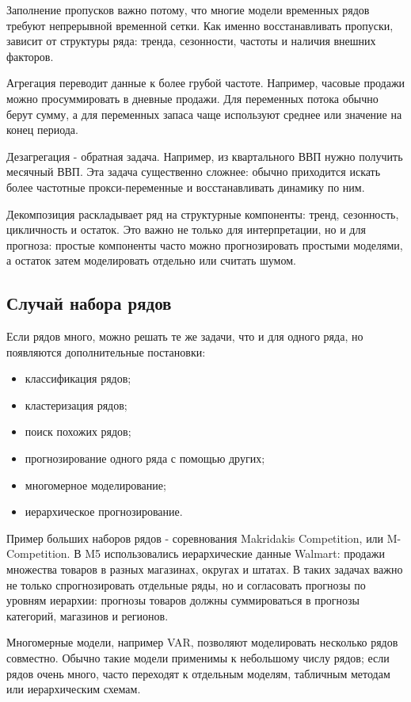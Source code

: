 \documentclass[12pt,fleqn]{article}
\begin{document}
Заполнение пропусков важно потому, что многие модели временных рядов требуют непрерывной временной сетки.
Как именно восстанавливать пропуски, зависит от структуры ряда: тренда, сезонности, частоты и наличия внешних факторов.

Агрегация переводит данные к более грубой частоте.
Например, часовые продажи можно просуммировать в дневные продажи.
Для переменных потока обычно берут сумму, а для переменных запаса чаще используют среднее или значение на конец периода.

Дезагрегация - обратная задача.
Например, из квартального ВВП нужно получить месячный ВВП.
Эта задача существенно сложнее: обычно приходится искать более частотные прокси-переменные и восстанавливать динамику по ним.

Декомпозиция раскладывает ряд на структурные компоненты: тренд, сезонность, цикличность и остаток.
Это важно не только для интерпретации, но и для прогноза: простые компоненты часто можно прогнозировать простыми моделями, а остаток затем моделировать отдельно или считать шумом.


\subsection{Случай набора рядов}


Если рядов много, можно решать те же задачи, что и для одного ряда, но появляются дополнительные постановки:

\begin{itemize}
  \item классификация рядов;
  \item кластеризация рядов;
  \item поиск похожих рядов;
  \item прогнозирование одного ряда с помощью других;
  \item многомерное моделирование;
  \item иерархическое прогнозирование.
\end{itemize}

Пример больших наборов рядов - соревнования Makridakis Competition, или M-Competition.
В M5 использовались иерархические данные Walmart: продажи множества товаров в разных магазинах, округах и штатах.
В таких задачах важно не только спрогнозировать отдельные ряды, но и согласовать прогнозы по уровням иерархии: прогнозы товаров должны суммироваться в прогнозы категорий, магазинов и регионов.

Многомерные модели, например VAR, позволяют моделировать несколько рядов совместно.
Обычно такие модели применимы к небольшому числу рядов; если рядов очень много, часто переходят к отдельным моделям, табличным методам или иерархическим схемам.
\end{document}
